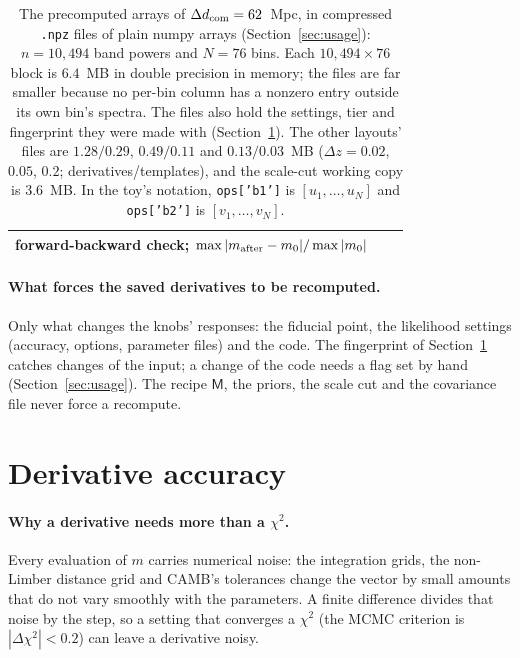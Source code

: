\documentclass[11pt]{article}
\newcommand{\mM}{\mathsf{M}}
\begin{document}
\begin{table}[tbp]
\begin{tabular}{lll}
      forward-backward check; $\max|m_{\rm after} - m_0|/\max|m_0|$ \\
    \hline
  \end{tabular}
  \caption{The precomputed arrays of $\Delta d_{\rm com} = 62$~Mpc, in
    compressed \texttt{.npz} files of plain numpy arrays
    (Section~\ref{sec:usage}): $n = 10{,}494$ band powers and $N = 76$
    bins.  Each $10{,}494 \times 76$ block is $6.4$~MB in double
    precision in memory; the files are far smaller because no per-bin
    column has a nonzero entry outside its own bin's spectra.  The
    files also hold the settings, tier and fingerprint they were made
    with (Section~\ref{sec:accuracy}).  The other layouts' files are
    $1.28/0.29$, $0.49/0.11$ and $0.13/0.03$~MB
    ($\Delta z = 0.02$, $0.05$, $0.2$;
    derivatives/templates), and the scale-cut working copy is
    $3.6$~MB.  In the toy's notation,
    \texttt{ops['b1']} is $[u_1, \ldots, u_N]$ and \texttt{ops['b2']} is
    $[v_1, \ldots, v_N]$.}
  \label{tab:arrays}
\end{table}

\paragraph{What forces the saved derivatives to be recomputed.}
Only what changes the knobs' responses: the fiducial point, the
likelihood settings (accuracy, options, parameter files) and the code.
The fingerprint of Section~\ref{sec:accuracy} catches changes of the
input; a change of the code needs a flag set by hand
(Section~\ref{sec:usage}).  The recipe $\mM$, the priors, the scale cut
and the covariance file never force a recompute.

\section{Derivative accuracy}
\label{sec:accuracy}

\paragraph{Why a derivative needs more than a $\chi^2$.}
Every evaluation of $m$ carries numerical noise: the integration grids,
the non-Limber distance grid and CAMB's tolerances change the vector by
small amounts that do not vary smoothly with the parameters.  A finite
difference divides that noise by the step, so a setting that converges
a $\chi^2$ (the MCMC criterion is $|\Delta\chi^2| < 0.2$) can leave a
derivative noisy.
\end{document}
